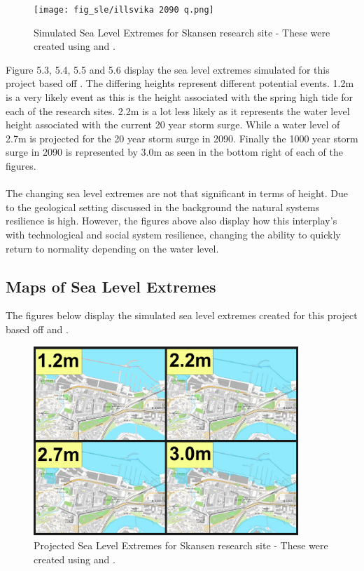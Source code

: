 \begin{figure}[h!]
    \centering
    \texttt{[image: fig\_sle/illsvika 2090 q.png]}
    \caption{Simulated Sea Level Extremes for Skansen research site - These were created using \cite{kartverket_se_2021} and \cite{stormflo_database_stormflo_2021}. }
    \label{fig:sle-skansen}
\end{figure}


Figure 5.3, 5.4, 5.5 and 5.6 display the sea level extremes simulated for this project based off \cite{kartverket_se_2020}. The differing heights represent different potential events. 1.2m is a very likely event as this is the height associated with the spring high tide for each of the research sites. 2.2m is a lot less likely as it represents the water level height associated with the current 20 year storm surge. While a water level of 2.7m is projected for the 20 year storm surge in 2090. Finally the 1000 year storm surge in 2090 is represented by 3.0m as seen in the bottom right of each of the figures.
\paragraph{}
The changing sea level extremes are not that significant in terms of height. Due to the geological setting discussed in the background the natural systems resilience is high. However, the figures above also display how this interplay's with technological and social system resilience, changing the ability to quickly return to normality depending on the water level. 


\subsection{Maps of Sea Level Extremes}
The figures below display the simulated sea level extremes created for this project based off \cite{kartverket_se_2020} and \cite{stormflo_database_stormflo_2021}.

\begin{figure}[h!]
    \centering
    \includegraphics[width=10cm]{fig_sle/skansen-sle-num.png}
    \caption{Projected Sea Level Extremes for Skansen research site - These were created using \cite{kartverket_se_2021} and \cite{stormflo_database_stormflo_2021}. }
    \label{fig:sle-skansen-num}
\end{figure}


